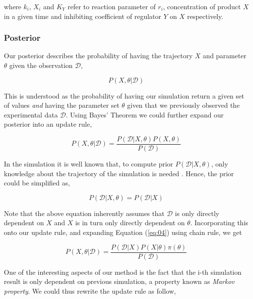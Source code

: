 \documentclass{bioinfo}
\begin{document}
where $k_i$, $X_i$ and $K_{Y}$ refer to reaction parameter of $r_i$, concentration of product $X$ in a given time and inhibiting coefficient of regulator $Y$ on $X$ respectively.

\subsubsection{Posterior}

Our posterior describes the probability of having the trajectory $X$ and parameter $\theta$ given the observation $\mathcal{D}$,

\begin{equation}
P(X, \theta | \mathcal{D})\label{eq:03}
\end{equation}

This is understood as the probability of having our simulation return a given set of values \textit{and} having the parameter set $\theta$ given that we previously observed the experimental data $\mathcal{D}$. Using Bayes' Theorem we could further expand our posterior into an update rule,

\begin{equation}
P(X, \theta | \mathcal{D}) = \frac{P(\mathcal{D} | X, \theta)  P(X, \theta)}{P(\mathcal{D})}\label{eq:04}
\end{equation}

In the simulation it is well known that, to compute prior $P(\mathcal{D} | X, \theta)$, only knowledge about the trajectory of the simulation is needed \citep{Feigelman16}. Hence, the prior could be simplified as,

\begin{equation}
P(\mathcal{D} | X, \theta) = P(\mathcal{D} | X)\label{eq:05}
\end{equation}

Note that the above equation inherently assumes that $\mathcal{D}$ is only directly dependent on $X$ and $X$ is in turn only directly dependent on $\theta$. Incorporating this onto our update rule, and expanding Equation (\ref{eq:04}) using chain rule, we get

\begin{equation}
P(X, \theta | \mathcal{D}) = \frac{P(\mathcal{D} | X)  P(X | \theta) \pi(\theta)}{P(\mathcal{D})}\label{eq:06}
\end{equation}

One of the interesting aspects of our method is the fact that the i-th simulation result is only dependent on previous simulation, a property known as \textit{Markov property}. We could thus rewrite the update rule as follow,
\end{document}
